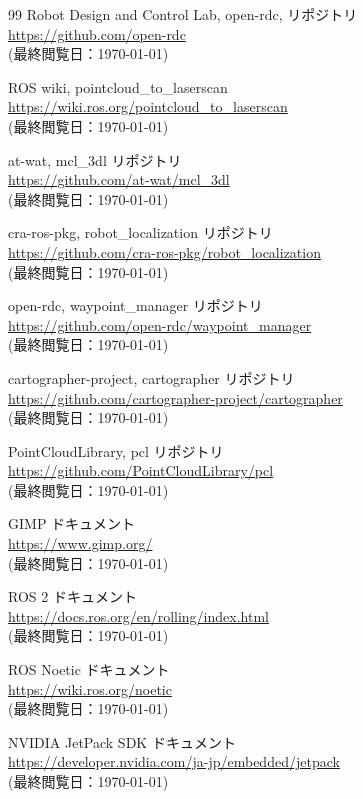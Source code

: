 \documentclass[twocolumn, 9pt]{jsproceedings}
\begin{document}
\begin{thebibliography}{99}
Robot Design and Control Lab, open-rdc, リポジトリ\\
\url{https://github.com/open-rdc}\\
(最終閲覧日：\today)

ROS wiki, pointcloud\_to\_laserscan\\
\url{https://wiki.ros.org/pointcloud_to_laserscan}\\
(最終閲覧日：\today)

at-wat, mcl\_3dl リポジトリ\\
\url{https://github.com/at-wat/mcl_3dl}\\
(最終閲覧日：\today)

cra-ros-pkg, robot\_localization リポジトリ\\
\url{https://github.com/cra-ros-pkg/robot_localization}\\
(最終閲覧日：\today)

open-rdc, waypoint\_manager リポジトリ\\
\url{https://github.com/open-rdc/waypoint_manager}\\
(最終閲覧日：\today)

cartographer-project, cartographer リポジトリ\\
\url{https://github.com/cartographer-project/cartographer}\\
(最終閲覧日：\today)

PointCloudLibrary, pcl リポジトリ\\
\url{https://github.com/PointCloudLibrary/pcl}\\
(最終閲覧日：\today)

GIMP ドキュメント\\
\url{https://www.gimp.org/}\\
(最終閲覧日：\today)

ROS 2 ドキュメント\\
\url{https://docs.ros.org/en/rolling/index.html}\\
(最終閲覧日：\today)

ROS Noetic ドキュメント\\
\url{https://wiki.ros.org/noetic}\\
(最終閲覧日：\today)

NVIDIA JetPack SDK ドキュメント\\
\url{https://developer.nvidia.com/ja-jp/embedded/jetpack}\\
(最終閲覧日：\today)


\end{thebibliography}
\end{document}
